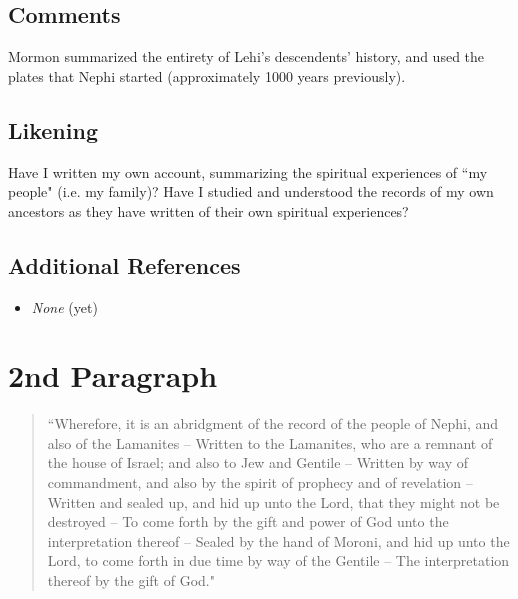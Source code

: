 \documentclass[12pt]{report}
\begin{document}
\subsection{Comments\label{titlePage:comments1}}
Mormon summarized the entirety of Lehi's descendents' history, and used the plates that Nephi started (approximately 1000 years previously).

\subsection{Likening\label{titlePage:likening1}}
Have I written my own account, summarizing the spiritual experiences of ``my people" (i.e. my family)?  Have I studied and understood the records of my own ancestors as they have written of their own spiritual experiences?

\subsection{Additional References\label{titlePage:references1}}
\begin{itemize}
\item \emph{None} (yet)
\end{itemize}

\section{2nd Paragraph\label{titlePage:2nd}}
\begin{center}
\begin{quote}
``Wherefore, it is an abridgment of the record of the people of Nephi, and also of the Lamanites -- Written to the Lamanites, who are a remnant of the house of Israel; and also to Jew and Gentile -- Written by way of commandment, and also by the spirit of prophecy and of revelation -- Written and sealed up, and hid up unto the Lord, that they might not be destroyed -- To come forth by the gift and power of God unto the interpretation thereof -- Sealed by the hand of Moroni, and hid up unto the Lord, to come forth in due time by way of the Gentile -- The interpretation thereof by the gift of God."
\end{quote}
\end{center}
\end{document}
